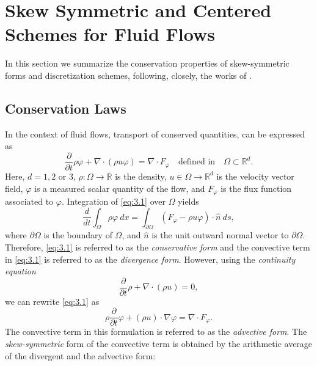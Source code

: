 \section{Skew Symmetric and Centered Schemes for Fluid Flows} \label{sec:skew}

In this section we summarize the conservation properties of skew-symmetric forms and discretization schemes, following, closely, the works of \cite{morinishi2010skew,morinishi1998fully,tadmor1984skew,reiss2014conservative}.

\subsection{Conservation Laws} \label{sec:skew.1}
In the context of fluid flows, transport of conserved quantities, can be expressed as
\begin{equation} \label{eq:3.1}
	\frac{\partial }{\partial t} \rho \varphi + \nabla \cdot ( \rho u \varphi  ) = \nabla \cdot F_{\varphi}\quad \text{defined in} \quad \Omega \subset \mathbb R^{d}.
\end{equation}
Here, $d = 1,2$ or $3$, $\rho:\Omega\to \mathbb R$ is the density, $u\in \Omega \to \mathbb R^{d}$ is the velocity vector field, $\varphi$ is a measured scalar quantity of the flow, and $F_{\varphi}$ is the flux function associated to $\varphi$. Integration of \eqref{eq:3.1} over $ \Omega$ yields
\begin{equation} \label{eq:3.2}
	\frac{d}{dt} \int_{\Omega} \rho \varphi \ dx = \int_{\partial \Omega} (F_{\varphi} - \rho u \varphi) \cdot \hat n\ ds,
\end{equation}
where $\partial \Omega$ is the boundary of $\Omega$, and $\hat n$ is the unit outward normal vector to $\partial \Omega$.  Therefore, \eqref{eq:3.1} is referred to as the \emph{conservative form} and the convective term in \eqref{eq:3.1} is referred to as the \emph{divergence form}. However, using the \emph{continuity equation}
\begin{equation} \label{eq:3.3}
	\frac{\partial }{\partial t} \rho + \nabla \cdot (\rho u) = 0,
\end{equation}
we can rewrite \eqref{eq:3.1} as
\begin{equation} \label{eq:3.4}
	\rho \frac{\partial }{\partial t} \varphi + (\rho u)\cdot \nabla \varphi = \nabla \cdot F_{\varphi}.
\end{equation}
The convective term in this formulation is referred to as the \emph{advective form}. The \emph{skew-symmetric} form of the convective term is obtained by the arithmetic average of the divergent and the advective form:
